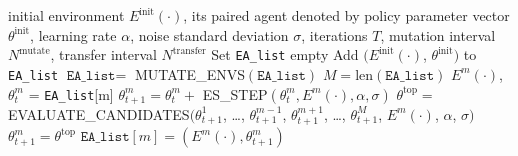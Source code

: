 \documentclass{article}
\newcommand{\ks}[1]{\comments{\textcolor{purple}{[Ken: #1]}}}
\newcommand{\rw}[1]{\comments{\textcolor{blue}{[Rui: #1]}}}
\newcommand{\comments}[1]{#1}
\begin{document}
\begin{algorithm}[htp]
\caption{POET Main Loop}
\label{alg:poet}
\begin{algorithmic}[1]
    initial environment $E^{\textrm{init}}(\cdot)$, its paired agent denoted by policy parameter vector $\theta^{\textrm{init}}$, learning rate $\alpha$, noise standard deviation $\sigma$, iterations $T$, mutation interval $N^{\textrm{mutate}}$, transfer interval $N^{\textrm{transfer}}$
    Set \texttt{EA\_list} empty 
   \STATE Add $(E^{\textrm{init}}(\cdot)$, $\theta^{\textrm{init}})$ to \texttt{EA\_list}
   \STATE $\texttt{EA\_list} =$ MUTATE\_ENVS$(\texttt{EA\_list})$ 
   \ENDIF
   \STATE $M = \textrm{len}(\texttt{EA\_list})$
   \STATE $E^{m}(\cdot)$, $\theta^{m}_{t}$ = \texttt{EA\_list}[m]
   \STATE $\theta^{m}_{t+1} = \theta^{m}_{t} +$ ES\_STEP$(\theta^{m}_{t}, E^{m}(\cdot), \alpha, \sigma)$  
   \ENDFOR
   \STATE $\theta^{\textrm{top}} = $ EVALUATE\_CANDIDATES$(\theta^{1}_{t+1}$, \ldots, $\theta^{m-1}_{t+1}$, $\theta^{m+1}_{t+1}$, \ldots, $\theta^{M}_{t+1}$, $E^{m}(\cdot)$, $\alpha$, $\sigma)$
   \STATE $\theta^{m}_{t+1} = \theta^{\textrm{top}}$ 
   \ENDIF
   \ENDIF
   \STATE $\texttt{EA\_list}[m] = (E^{m}(\cdot), \theta^{m}_{t+1})$  
   
   \ENDFOR
   \ENDFOR
   


   
\end{algorithmic}
\end{algorithm}
\end{document}
